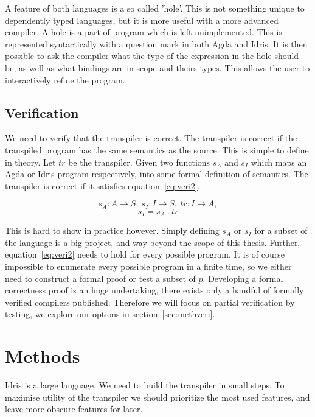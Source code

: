 \documentclass[parskip=half]{scrartcl}
\begin{document}
A feature of both languages is a so called 'hole'. This is not something unique
to dependently typed languages, but it is more useful with a more advanced
compiler. A hole is a part of program which is left unimplemented. This is
represented syntactically with a question mark in both Agda and Idris. It
is then possible to ask the compiler what the type of the expression in the
hole should be, as well as what bindings are in scope and theirs types. This
allows the user to interactively refine the program.


\subsection{Verification}\label{sec:veri}

We need to verify that the transpiler is correct. The transpiler is correct if
the transpiled program has the same semantics as the source.
This is simple to define in theory.
Let $tr$ be the transpiler.
Given two functions $s_A$ and $s_I$ which maps an Agda or Idris program
respectively, into some formal definition of semantics.
The transpiler is correct if it satisfies equation~\ref{eq:veri2}.

\begin{equation} \label{eq:veri1}
  s_A : A \rightarrow S,
  \ s_I : I \rightarrow S,
  \ tr : I \rightarrow A,
\end{equation}
\begin{equation} \label{eq:veri2}
  s_I = s_A\ .\ tr
\end{equation}

This is hard to show in practice however. Simply defining $s_A$ or $s_I$ for
a subset of the language is a big project, and way beyond the scope of this
thesis.
Further, equation~\ref{eq:veri2} needs to hold for every possible program.
It is of course impossible to enumerate every possible program in a finite
time, so we either need to construct a formal proof or test a subset of $p$.
Developing a formal correctness proof is an huge undertaking, there
exists only a handful of formally verified compilers published. Therefore we
will focus on partial verification by testing, we explore our options in
section~\ref{sec:methveri}.


\section{Methods}
Idris is a large language. We need to build the transpiler in small steps. To
maximise utility of the transpiler we should prioritize the most used features,
and leave more obscure features for later.
\end{document}
